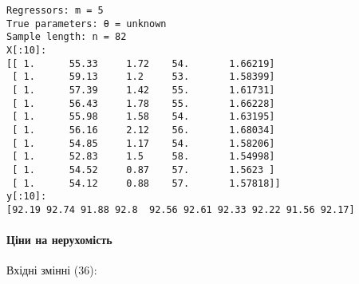 \documentclass[11pt]{article}
\begin{document}
    \begin{Verbatim}[commandchars=\\\{\}]
Regressors: m = 5
True parameters: θ = unknown
Sample length: n = 82
X[:10]:
[[ 1.      55.33     1.72    54.       1.66219]
 [ 1.      59.13     1.2     53.       1.58399]
 [ 1.      57.39     1.42    55.       1.61731]
 [ 1.      56.43     1.78    55.       1.66228]
 [ 1.      55.98     1.58    54.       1.63195]
 [ 1.      56.16     2.12    56.       1.68034]
 [ 1.      54.85     1.17    54.       1.58206]
 [ 1.      52.83     1.5     58.       1.54998]
 [ 1.      54.52     0.87    57.       1.5623 ]
 [ 1.      54.12     0.88    57.       1.57818]]
y[:10]:
[92.19 92.74 91.88 92.8  92.56 92.61 92.33 92.22 91.56 92.17]

    \end{Verbatim}

    \paragraph{Ціни на
нерухомість}\label{ux446ux456ux43dux438-ux43dux430-ux43dux435ux440ux443ux445ux43eux43cux456ux441ux442ux44c}

Вхідні змінні (36):
\end{document}
